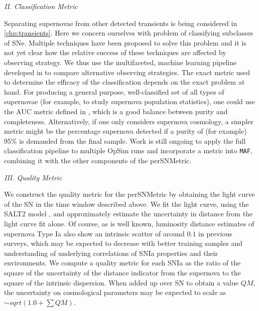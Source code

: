 \emph{II. Classification Metric}

Separating supernovae from other detected transients is being considered in 
\autoref{chp:transients}. Here we concern ourselves with problem of classifying subclasses of 
SNe. Multiple techniques have been proposed to solve this problem and it is not yet clear how the 
relative success of these techniques are affected by observing strategy. We thus use the 
multifaceted, machine learning pipeline developed in \citet{Lochner2016} to compare alternative 
observing strategies. The exact metric used to determine the efficacy of the classification depends 
on the exact problem at hand. For producing a general purpose, well-classified set of all types of 
supernovae (for example, to study supernova population statistics), one could use the AUC metric 
defined in \citet{Lochner2016}, which is a good balance between purity and completeness. 
Alternatively, if one only considers supernova cosmology, a simpler metric might be the percentage 
supernova detected if a purity of (for example) 95\% is demanded from the final sample. Work is 
still ongoing to apply the full classification pipeline to multiple OpSim runs and incorporate a 
metric into \texttt{MAF}, combining it with the other components of the perSNMetric.


\emph{III. Quality Metric}

We construct the quality metric for the perSNMetric by obtaining the
light curve of the SN in the time window described above. We fit the
light curve, using the SALT2 model \citep{Guy2007}, and approximately estimate the uncertainty in 
distance from
the light curve fit alone. Of course, as is well known, luminosity
distance estimates of supernova Type Ia also show an intrinsic scatter
of around $0.1$ in previous surveys, which may be expected to decrease
with better training samples and understanding of underlying
correlations of SNIa properties and their environments. We compute a
quality metric for each SNIa as the ratio of the square of the
uncertainty of the distance indicator from the supernova to the square
of the intrinsic dispersion. When added up over SN to obtain a value
$QM$, the uncertainty on cosmological parameters may be expected to
scale as $\sim sqrt(1.0 + \sum QM)$. 




